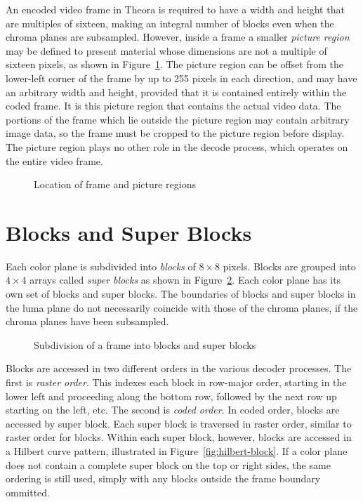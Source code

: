 \documentclass[11pt,letterpaper]{book}
\newcommand{\term}[1]{{\em #1}}
\numberwithin{equation}{chapter}
\numberwithin{figure}{chapter}
\numberwithin{table}{chapter}
\begin{document}
An encoded video frame in Theora is required to have a width and height that
 are multiples of sixteen, making an integral number of blocks even when the
 chroma planes are subsampled.
However, inside a frame a smaller \term{picture region} may be defined
 to present material whose dimensions are not a multiple of sixteen pixels, as
 shown in Figure~\ref{fig:pic-frame}.
The picture region can be offset from the lower-left corner of the frame by up
 to 255 pixels in each direction, and may have an arbitrary width and height,
 provided that it is contained entirely within the coded frame.
It is this picture region that contains the actual video data.
The portions of the frame which lie outside the picture region may contain
 arbitrary image data, so the frame must be cropped to the picture region
 before display.
The picture region plays no other role in the decode process, which operates on
 the entire video frame.

\begin{figure}[htb]
\begin{center}

\end{center}
\caption{Location of frame and picture regions}
\label{fig:pic-frame}
\end{figure}

\section{Blocks and Super Blocks}
\label{sec:blocks-and-sbs}

Each color plane is subdivided into \term{blocks} of $8\times 8$ pixels.
Blocks are grouped into $4\times 4$ arrays called \term{super blocks} as
shown in Figure~\ref{fig:superblock}.
Each color plane has its own set of blocks and super blocks.
The boundaries of blocks and super blocks in the luma plane do not necessarily
 coincide with those of the chroma planes, if the chroma planes have been
 subsampled.

\begin{figure}[htb]
 \begin{center}
 
 \end{center}
 \caption{Subdivision of a frame into blocks and super blocks}
 \label{fig:superblock}
\end{figure}

Blocks are accessed in two different orders in the various decoder processes.
The first is \term{raster order}.
This indexes each block in row-major order, starting in the lower left and
 proceeding along the bottom row, followed by the next row up starting on the
 left, etc.
The second is \term{coded order}.
In coded order, blocks are accessed by super block.
Each super block is traversed in raster order, similar to raster order for
 blocks.
Within each super block, however, blocks are accessed in a Hilbert curve
 pattern, illustrated in Figure~\ref{fig:hilbert-block}.
If a color plane does not contain a complete super block on the top or right
 sides, the same ordering is still used, simply with any blocks outside the
 frame boundary ommitted.
\end{document}
